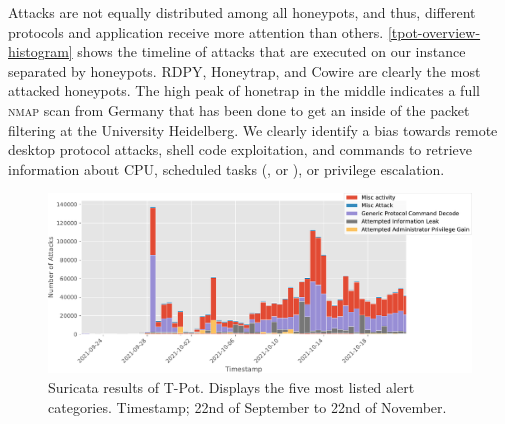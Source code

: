 Attacks are not equally distributed among all honeypots, and thus, different protocols and application receive more attention than others.
\autoref{tpot-overview-histogram} shows the timeline of attacks that are executed on our instance separated by honeypots.
RDPY, Honeytrap, and Cowire are clearly the most attacked honeypots.
The high peak of honetrap in the middle indicates a full \textsc{nmap} scan from Germany that has been done to get an inside of the packet filtering at the University Heidelberg.
We clearly identify a bias towards remote desktop protocol attacks, shell code exploitation, and commands to retrieve information about CPU, scheduled tasks (, or ), or privilege escalation.

\begin{figure}[ht]
    \centering
    \includegraphics[width=\textwidth]{figures/tpot-suricata-alerts.pdf}
    \caption[Suricata results of T-Pot]{Suricata results of T-Pot. Displays the five most listed alert categories. Timestamp; 22nd of September to 22nd of November.}
    \label{fig:suricata-results}
\end{figure}

